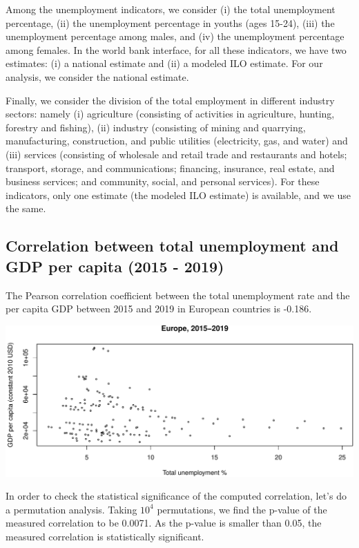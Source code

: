 \documentclass[
]{article}
\begin{document}
Among the unemployment indicators, we consider (i) the total
unemployment percentage, (ii) the unemployment percentage in youths
(ages 15-24), (iii) the unemployment percentage among males, and (iv)
the unemployment percentage among females. In the world bank interface,
for all these indicators, we have two estimates: (i) a national estimate
and (ii) a modeled ILO estimate. For our analysis, we consider the
national estimate.

Finally, we consider the division of the total employment in different
industry sectors: namely (i) agriculture (consisting of activities in
agriculture, hunting, forestry and fishing), (ii) industry (consisting
of mining and quarrying, manufacturing, construction, and public
utilities (electricity, gas, and water) and (iii) services (consisting
of wholesale and retail trade and restaurants and hotels; transport,
storage, and communications; financing, insurance, real estate, and
business services; and community, social, and personal services). For
these indicators, only one estimate (the modeled ILO estimate) is
available, and we use the same.

\hypertarget{correlation-between-total-unemployment-and-gdp-per-capita-2015---2019}{%
\subsection{Correlation between total unemployment and GDP per capita
(2015 -
2019)}\label{correlation-between-total-unemployment-and-gdp-per-capita-2015---2019}}

The Pearson correlation coefficient between the total unemployment rate
and the per capita GDP between 2015 and 2019 in European countries is
-0.186.

\includegraphics{main_files/figure-latex/unnamed-chunk-7-1.pdf}

In order to check the statistical significance of the computed
correlation, let's do a permutation analysis. Taking \ensuremath{10^{4}}
permutations, we find the p-value of the measured correlation to be
0.0071. As the p-value is smaller than 0.05, the measured correlation is
statistically significant.
\end{document}
